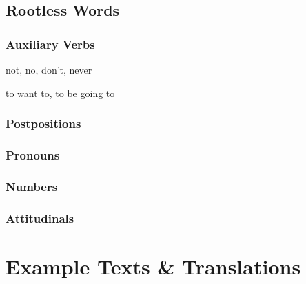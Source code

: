 \documentclass[a4paper,10pt,twoside,openright]{memoir}
\begin{document}
\chapter{Rootless Words}
\begin{multicols*}{2}
\section{Auxiliary Verbs}
\begin{description}[leftmargin=*]
    \begin{description}[labelwidth=*]
    \item[] not, no, don't, never
    \end{description}
    \begin{description}[labelwidth=*]
    \item[] to want to, to be going to 
    \end{description}
\end{description}

\section{Postpositions}

\section{Pronouns}

\section{Numbers}

\section{Attitudinals}

\end{multicols*}

\part{Example Texts \& Translations}

\end{document}
